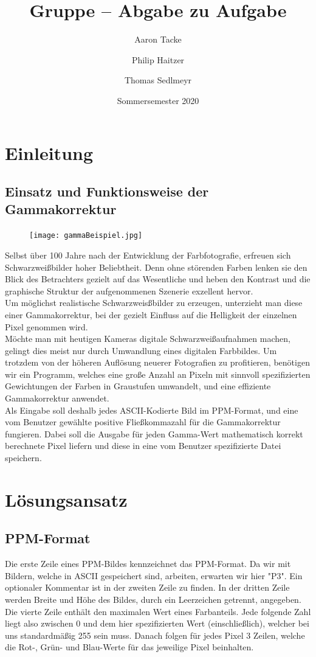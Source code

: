 \documentclass[course=erap]{aspdoc}
\author{Aaron Tacke \and Philip Haitzer \and Thomas Sedlmeyr}
\date{Sommersemester 2020} %
\title{Gruppe \theGroup{} -- Abgabe zu Aufgabe \theNumber}
\begin{document}
	\maketitle
	
	\section{Einleitung}
	\subsection{Einsatz und Funktionsweise der Gammakorrektur}
	
	\begin{figure}
		\texttt{[image: gammaBeispiel.jpg]}
	\end{figure}
	Selbst über 100 Jahre nach der Entwicklung der Farbfotografie, erfreuen sich Schwarzweißbilder hoher Beliebtheit. Denn ohne störenden Farben lenken sie den Blick des Betrachters gezielt auf das Wesentliche und heben den Kontrast und die graphische Struktur der aufgenommenen Szenerie exzellent hervor.\\
	Um möglichst realistische Schwarzweisßbilder zu erzeugen, unterzieht man diese einer Gammakorrektur, bei der gezielt Einfluss auf die Helligkeit der einzelnen Pixel genommen wird.\\
	
	\noindent Möchte man mit heutigen Kameras digitale Schwarzweißaufnahmen machen, gelingt dies meist nur durch Umwandlung eines digitalen Farbbildes. Um trotzdem von der höheren Auflösung neuerer Fotografien zu profitieren, benötigen wir ein Programm, welches eine große Anzahl an Pixeln mit sinnvoll spezifizierten Gewichtungen der Farben in Graustufen umwandelt, und eine effiziente Gammakorrektur anwendet.\\
	
	\noindent Als Eingabe soll deshalb jedes ASCII-Kodierte Bild im PPM-Format, und eine vom Benutzer gewählte positive Fließkommazahl für die Gammakorrektur fungieren. Dabei soll die Ausgabe für jeden Gamma-Wert mathematisch korrekt berechnete Pixel liefern und diese in eine vom Benutzer spezifizierte Datei speichern.
	
	
	
	\section{Lösungsansatz}
	\subsection{PPM-Format}
	Die erste Zeile eines PPM-Bildes kennzeichnet das PPM-Format. Da wir mit Bildern, welche in ASCII gespeichert sind, arbeiten, erwarten wir hier "P3".
	Ein optionaler Kommentar ist in der zweiten Zeile zu finden.
	In der dritten Zeile werden Breite und Höhe des Bildes, durch ein Leerzeichen getrennt, angegeben.
    Die vierte Zeile enthält den maximalen Wert eines Farbanteils. Jede folgende Zahl liegt also zwischen 0 und dem hier spezifizierten Wert (einschließlich), welcher bei uns standardmäßig 255 sein muss.
    Danach folgen für jedes Pixel 3 Zeilen, welche die Rot-, Grün- und Blau-Werte für das jeweilige Pixel beinhalten.
	
\end{document}

